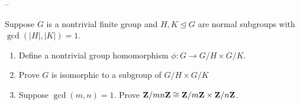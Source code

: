 \documentclass[11pt,twoside,openany]{memoir}
\begin{document}
    --

    \begin{exercise}
        Suppose $G$ is a nontrivial finite group and $H,K \unlhd G$ are normal subgroups with $\gcd \left( |H|,|K| \right) = 1$.
            \begin{enumerate}[label = (\arabic*),itemsep=1pt,topsep=3pt]
                \item Define a nontrivial group homomorphism $\phi:G \rightarrow G/H \times G/K$.
                \item Prove $G$ is isomorphic to a subgroup of $G/H \times G/K$
                \item Suppose $\gcd(m,n) = 1$. Prove $\mathbf{Z}/mn \mathbf{Z} \cong \mathbf{Z}/m\mathbf{Z} \times \mathbf{Z}/n\mathbf{Z}$.
            \end{enumerate}
    \end{exercise}
\end{document}
